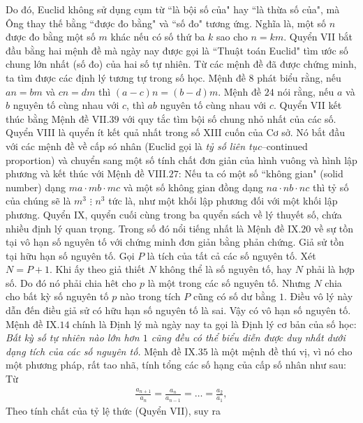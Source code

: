 \begin{multicols}{2}
	\vskip 0.1cm
	Do đó, Euclid không sử dụng cụm từ ``là bội số của" hay ``là thừa số của", mà Ông thay thế bằng ``được đo bằng" và ``số đo" tương ứng. Nghĩa là, một số $n$  được đo bằng một số $m$  khác nếu có số thứ ba $k$  sao cho  $n = km$.
	\vskip 0.1cm
	Quyển VII bắt đầu bằng hai mệnh đề mà ngày nay được gọi là ``Thuật toán Euclid" tìm ước số chung lớn nhất (số đo) của hai số tự nhiên.
	\vskip 0.1cm
	Từ các mệnh đề đã được chứng minh, ta tìm được các định lý tương tự trong số học. Mệnh đề $8$ phát biểu rằng, nếu $an = bm$  và $cn = dm$ thì  $(a-c)n = (b-d)m$.  Mệnh đề $24$ nói rằng, nếu $a$ và $b$  nguyên tố cùng nhau với $c$,  thì  $ab$ nguyên tố cùng nhau với $c$.  Quyển VII kết thúc bằng Mệnh đề VII.$39$ với quy tắc tìm bội số chung nhỏ nhất của các số.
	\vskip 0.1cm
	Quyển VIII là quyển ít kết quả nhất trong số XIII cuốn của Cơ sở. Nó bắt đầu với các mệnh đề về cấp só nhân (Euclid gọi là \textit{tỷ số liên tục}--continued proportion) và chuyển sang một số tính chất đơn giản của hình vuông và hình lập phương và kết thúc với Mệnh đề VIII.$27$: Nếu ta có một số ``không gian" (solid number) dạng $ma \cdot mb \cdot mc$  và một số không gian đồng dạng  $na \cdot nb \cdot nc$ thì tỷ số của chúng sẽ là  $m^3 \,\,\vdots \,\, n^3$ tức là, như một khối lập phương đối với một khối lập phương.
	\vskip 0.1cm
	Quyển IX, quyển cuối cùng trong ba quyển sách về lý thuyết số, chứa nhiều định lý quan trọng. Trong số đó nổi tiếng nhất là Mệnh đề IX.$20$ về sự tồn tại vô hạn số nguyên tố với chứng minh đơn giản bằng phản chứng. Giả sử tồn tại hữu hạn số nguyên tố. Gọi $P$ là tích của tất cả các số nguyên tố. Xét $N = P + 1$.  Khi ấy theo giả thiết $N$  không thể là số nguyên tố, hay $N$  phải là hợp số. Do đó nó phải chia hêt cho $p$  là một trong các số nguyên tố. Nhưng $N$  chia cho bất kỳ số nguyên tố $p$  nào trong tích  $P$ cũng có số dư bằng $1$. Điều vô lý này dẫn đến điều giả sử có hữu hạn số nguyên tố là sai. Vậy có vô hạn số nguyên tố. Mệnh đề IX.$14$ chính là Định lý mà ngày nay ta gọi là Định lý cơ bản của số học: \textit{Bất kỳ số tự nhiên nào lớn hơn $1$ cũng đều có thể biểu diễn được duy nhất dưới dạng tích của các số nguyên tố.}
	\vskip 0.1cm  
	Mệnh đề IX.$35$ là một mệnh đề thú vị, vì nó cho một phương pháp, rất tao nhã, tính tổng các số hạng của cấp số nhân như sau: Từ
	\begin{align*}
		\frac{a_{n+1}}{a_n} = \frac{a_n}{a_{n-1}} = \ldots= \frac{a_2}{a_1},
	\end{align*}
	Theo tính chất của tỷ lệ thức (Quyển VII), suy ra
	\begin{align*}

\end{align*}
\end{multicols}
